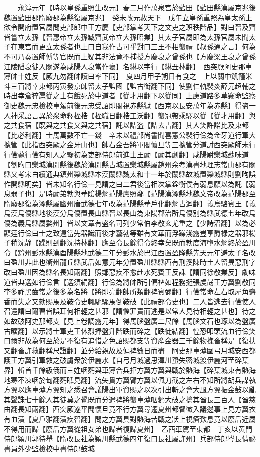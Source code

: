 　　永淳元年【時以皇孫重照生改元】春二月作萬泉宫於藍田【藍田縣漢屬京兆後魏置藍田郡隋廢郡為縣復屬京兆】　癸未改元赦天下　戊午立皇孫重照為皇太孫上欲令開府置官屬問吏部郎中王方慶【吏部掌考天下之文吏之班秩階品】對曰晉及齊皆嘗立太孫【晉惠帝立太孫臧齊武帝立大孫昭業】其太子官屬即為太孫官屬未聞太子在東宫而更立太孫者也上曰自我作古可乎對曰三王不相襲禮【叔孫通之言】何為不可乃奏置師傅等官既而上疑其非法竟不補授方慶裒之曾孫也【方慶梁王裒之曾孫江陵䧟裒徙入關遂為咸陽人裒當作褒】名綝以字行【綝丑林翻】　西突厥阿史那車薄帥十姓反【厥九勿翻帥讀曰率下同】　夏四月甲子朔日有食之　上以關中飢饉米斗三百將幸東都丙寅發京師留太子監國【監古衘翻下同】使劉仁軌裴炎薛元超輔之時出幸倉猝扈從之士有餓死於中道者【從才用翻下以從同】上慮道路多草竊命監察御史魏元忠檢校車駕前後元忠受詔即閱視赤縣獄【西京以長安萬年為赤縣】得盗一人神采語言異於衆命釋桎梏【桎職日翻梏工沃翻】襲冠帶乘驛以從【從才用翻】與之共食宿【既與之共食又與之共宿】託以詰盗【詰去吉翻】其人笑許諾比及東都【比必利翻】士馬萬數不亡一錢　辛未以禮部尚書聞喜憲公裴行儉為金牙道行軍大摠管【此指西突厥之金牙山也】帥右金吾將軍閻懷旦等三摠管分道討西突厥師未行行儉薨行儉有知人之鑒初為吏部侍郎前進士王勮【勮其劇翻】咸陽尉欒城蘇味道【劉昫曰欒城漢開縣後魏於漢開縣古城置欒城縣屬趙州余考漢書地理志常山郡有關縣又考宋白續通典鎮州欒城縣本漢關縣魏太和十一年於關縣故城置欒城縣則劉昫誤作開縣明矣】皆未知名行儉一見謂之曰二君後當相次掌銓衡僕有弱息願以為託【弱息弱子也】是時勮弟勃與華隂楊烱范陽盧照鄰【范陽漢涿縣地魏文帝改為范陽郡至隋廢郡復為涿縣屬幽州唐武德七年改為范陽縣華戶化翻烱古迴翻】義烏駱賓王【義烏漢烏傷縣地後漢分烏傷置長山縣晉以長山為東陽郡治所烏傷別為縣武德七年改烏傷為義烏縣屬婺州】皆以文章有盛名司列少常伯李敬玄尤重之【少詩沼翻】以為必顯逹行儉曰士之致遠當先器識而後才藝勃等雖有文華而浮躁淺露豈享爵禄之器邪楊子稍沈静【躁則到翻沈持林翻】應至令長餘得令終幸矣既而勃度海墮水烱終於盈川令【黔州彭水縣漢酉陽縣地武德二年分彭水於巴江西置盈隆縣先天元年避太子名改曰盈川非此也衢州龍丘縣武后如意元年分置盈川縣縣西有刑溪陳時土人留異惡刑字改曰盈川因為縣名長知兩翻】照鄰惡疾不愈赴水死賓王反誅【謂同徐敬業反】勮味道皆典選如行儉言【選須絹翻】行儉為將帥所引偏禆如程務挺張䖍勗王方翼劉敬同李多祚黑齒常之後多為名將【將即亮翻帥所類翻禆賓彌翻】行儉常命左右取犀角麝香而失之又勑賜馬及鞍令史輒馳驟馬倒鞍破【此禮部令史也】二人皆逃去行儉使人召還謂曰爾曹皆誤耳何相輕之甚邪【謂懼罪責而逃是以常人見待相輕之甚也】待之如故破阿史那都支【見上卷調露元年】得馬腦盤廣二尺餘【馬腦文石也琢以為盤廣古曠翻】以示將士軍吏王休烈捧盤升階跌而碎之【跌徒結翻】惶恐叩頭流血行儉笑曰爾非故為何至於是不復有追惜之色詔賜都支等資產金器三千餘物襍畜稱是【復扶又翻畜許救翻稱尺證翻】並分給親故及偏禆數日而盡　阿史那車薄圍弓月城安西都護王方翼引軍救之破虜衆於伊麗水【自弓月城過思渾川蟄失密城渡伊麗河至碎葉界】斬首千餘級俄而三姓咽麫與車薄合兵拒方翼方翼與戰於熱海【碎葉城東有熱海地寒不凍咽於甸翻麫眡見翻】流矢貫方翼臂方翼以佩刀截之左右不知所將胡兵謀執方翼以應車薄方翼知之悉召會議陽出軍資賜之以次引出斬之會大風方翼振金鼔以亂其聲誅七十餘人其徒莫之覺既而分遣禆將襲車薄咽麫大破之擒其酋長三百人【酋慈由翻長知兩翻】西突厥遂平閻懷旦竟不行方翼尋遷夏州都督徵入議邊事上見方翼衣有血漬【夏戶雅翻漬疾智翻】問之方翼具對熱海苦戰之狀上視瘡歎息竟以廢后近屬不得用而歸【廢后方翼從祖女弟也歸者復歸夏州】　乙酉車駕至東都　丁亥以黄門侍郎潁川郭待舉【隋改長社為穎川縣武德四年復曰長社屬許州】兵部侍郎岑長倩祕書員外少監檢校中書侍郎鼓城